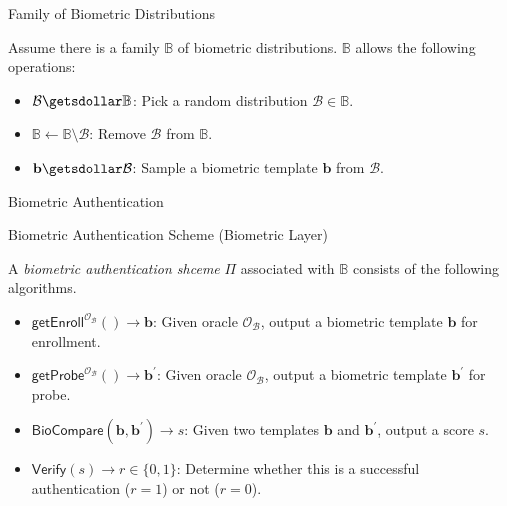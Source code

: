 \begin{frame}{Family of Biometric Distributions}

Assume there is a family $\mathbb{B}$ of biometric distributions. $\mathbb{B}$ allows the following operations:
\pause

\begin{itemize}

	\item $\mathcal{B} \getsdollar \mathbb{B}$: Pick a random distribution $\mathcal{B} \in \mathbb{B}$.
	\pause

	\item $\mathbb{B} \gets \mathbb{B} \setminus \mathcal{B}$: Remove $\mathcal{B}$ from $\mathbb{B}$.
	\pause

	\item $\mathbf{b} \getsdollar \mathcal{B}$: Sample a biometric template $\mathbf{b}$ from $\mathcal{B}$.

\end{itemize}

\end{frame}


\begin{frame}{Biometric Authentication}

\begin{definition}{Biometric Authentication Scheme (Biometric Layer)}

A \emph{biometric authentication shceme} $\Pi$ associated with $\mathbb{B}$ consists of the following algorithms.

\begin{itemize}

	\item<2-> $\textsf{getEnroll}^{\mathcal{O}_{\mathcal{B}}}() \to \mathbf{b}$: Given oracle $\mathcal{O}_{\mathcal{B}}$, output a biometric template $\mathbf{b}$ for enrollment.

	\item<3-> $\textsf{getProbe}^{\mathcal{O}_{\mathcal{B}}}() \to \mathbf{b}^\prime$: Given oracle $\mathcal{O}_{\mathcal{B}}$, output a biometric template $\mathbf{b}^\prime$ for probe.

	\item<4-> $\textsf{BioCompare}(\mathbf{b}, \mathbf{b}^\prime) \to s$: Given two templates $\mathbf{b}$ and $\mathbf{b}^\prime$, output a score $s$.

	\item<5-> $\textsf{Verify}(s) \to r \in \{0,1\}$: Determine whether this is a successful authentication ($r = 1$) or not ($r = 0$).

\end{itemize}

\end{definition}


\end{frame}


